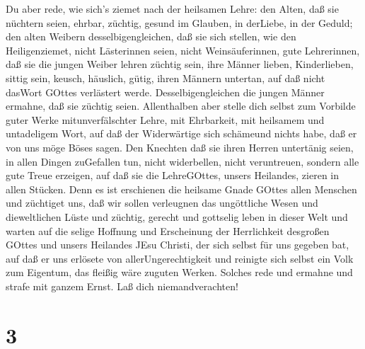  Du aber rede, wie sich's ziemet nach der heilsamen Lehre:
 den Alten, daß sie nüchtern seien, ehrbar, züchtig, gesund
im Glauben, in derLiebe, in der Geduld;  den alten Weibern
desselbigengleichen, daß sie sich stellen, wie den Heiligenziemet, nicht
Lästerinnen seien, nicht Weinsäuferinnen, gute Lehrerinnen, 
daß sie die jungen Weiber lehren züchtig sein, ihre Männer lieben,
Kinderlieben,  sittig sein, keusch, häuslich, gütig, ihren
Männern untertan, auf daß nicht dasWort GOttes verlästert werde.
 Desselbigengleichen die jungen Männer ermahne, daß sie
züchtig seien.  Allenthalben aber stelle dich selbst zum
Vorbilde guter Werke mitunverfälschter Lehre, mit Ehrbarkeit,
 mit heilsamem und untadeligem Wort, auf daß der
Widerwärtige sich schämeund nichts habe, daß er von uns möge Böses
sagen.  Den Knechten daß sie ihren Herren untertänig seien,
in allen Dingen zuGefallen tun, nicht widerbellen,  nicht
veruntreuen, sondern alle gute Treue erzeigen, auf daß sie die
LehreGOttes, unsers Heilandes, zieren in allen Stücken. 
Denn es ist erschienen die heilsame Gnade GOttes allen Menschen
 und züchtiget uns, daß wir sollen verleugnen das
ungöttliche Wesen und dieweltlichen Lüste und züchtig, gerecht und
gottselig leben in dieser Welt  und warten auf die selige
Hoffnung und Erscheinung der Herrlichkeit desgroßen GOttes und unsers
Heilandes JEsu Christi,  der sich selbst für uns gegeben
bat, auf daß er uns erlösete von allerUngerechtigkeit und reinigte sich
selbst ein Volk zum Eigentum, das fleißig wäre zuguten Werken.
 Solches rede und ermahne und strafe mit ganzem Ernst. Laß
dich niemandverachten!

\hypertarget{section-2}{%
\section{3}\label{section-2}}

